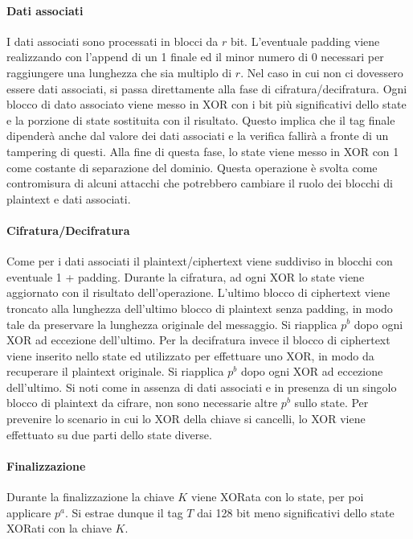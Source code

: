 \paragraph*{Dati associati}
I dati associati sono processati in blocci da $r$ bit. L'eventuale padding viene realizzando con l'append di un 1 finale ed il minor numero di 0 necessari per raggiungere una lunghezza che sia multiplo di $r$. Nel caso in cui non ci dovessero essere dati associati, si passa direttamente alla fase di cifratura/decifratura. Ogni blocco di dato associato viene messo in XOR con i bit più significativi dello state e la porzione di state sostituita con il risultato. Questo implica che il tag finale dipenderà anche dal valore dei dati associati e la verifica fallirà a fronte di un tampering di questi. 
\newline\newline
Alla fine di questa fase, lo state viene messo in XOR con 1 come costante di separazione del dominio. Questa operazione è svolta come contromisura di alcuni attacchi che potrebbero cambiare il ruolo dei blocchi di plaintext e dati associati. 
\paragraph*{Cifratura/Decifratura}
Come per i dati associati il plaintext/ciphertext viene suddiviso in blocchi con eventuale 1 + padding. Durante la cifratura, ad ogni XOR lo state viene aggiornato con il risultato dell'operazione. L'ultimo blocco di ciphertext viene troncato alla lunghezza dell'ultimo blocco di plaintext senza padding, in modo tale da preservare la lunghezza originale del messaggio. Si riapplica $p^b$ dopo ogni XOR ad eccezione dell'ultimo. 
\newline\newline
Per la decifratura invece il blocco di ciphertext viene inserito nello state ed utilizzato per effettuare uno XOR, in modo da recuperare il plaintext originale. Si riapplica $p^b$ dopo ogni XOR ad eccezione dell'ultimo. 
\newline\newline
Si noti come in assenza di dati associati e in presenza di un singolo blocco di plaintext da cifrare, non sono necessarie altre $p^b$ sullo state. Per prevenire lo scenario in cui lo XOR della chiave si cancelli, lo XOR viene effettuato su due parti dello state diverse. 
\paragraph*{Finalizzazione}
Durante la finalizzazione la chiave $K$ viene XORata con lo state, per poi applicare $p^a$. Si estrae dunque il tag $T$ dai 128 bit meno significativi dello state XORati con la chiave $K$. 
